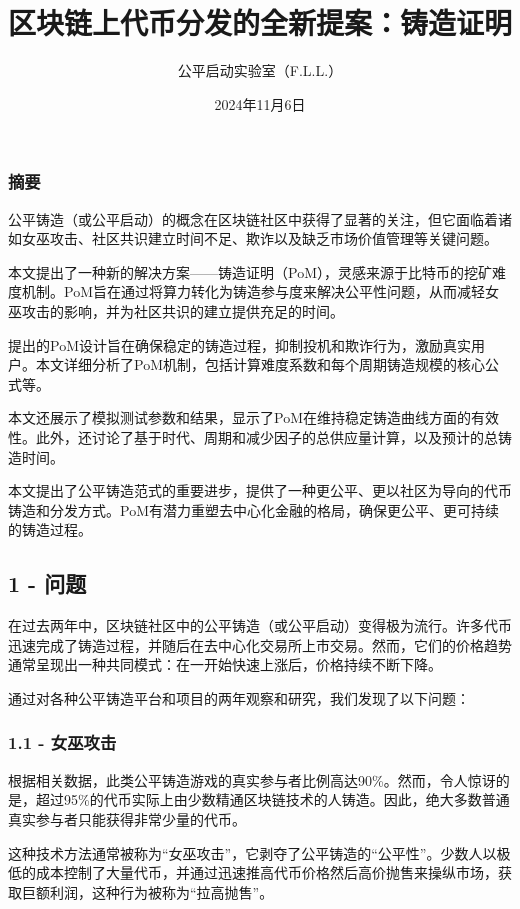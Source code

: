 \documentclass[
]{article}
\title{区块链上代币分发的全新提案：铸造证明}
\author{公平启动实验室（F.L.L.）}
\date{2024年11月6日}
\begin{document}
\maketitle

\subsubsection{摘要}\label{ux6458ux8981}

公平铸造（或公平启动）的概念在区块链社区中获得了显著的关注，但它面临着诸如女巫攻击、社区共识建立时间不足、欺诈以及缺乏市场价值管理等关键问题。

本文提出了一种新的解决方案------铸造证明（PoM），灵感来源于比特币的挖矿难度机制。PoM旨在通过将算力转化为铸造参与度来解决公平性问题，从而减轻女巫攻击的影响，并为社区共识的建立提供充足的时间。

提出的PoM设计旨在确保稳定的铸造过程，抑制投机和欺诈行为，激励真实用户。本文详细分析了PoM机制，包括计算难度系数和每个周期铸造规模的核心公式等。

本文还展示了模拟测试参数和结果，显示了PoM在维持稳定铸造曲线方面的有效性。此外，还讨论了基于时代、周期和减少因子的总供应量计算，以及预计的总铸造时间。

本文提出了公平铸造范式的重要进步，提供了一种更公平、更以社区为导向的代币铸造和分发方式。PoM有潜力重塑去中心化金融的格局，确保更公平、更可持续的铸造过程。

\subsection{1 - 问题}\label{ux95eeux9898}

在过去两年中，区块链社区中的公平铸造（或公平启动）变得极为流行。许多代币迅速完成了铸造过程，并随后在去中心化交易所上市交易。然而，它们的价格趋势通常呈现出一种共同模式：在一开始快速上涨后，价格持续不断下降。

通过对各种公平铸造平台和项目的两年观察和研究，我们发现了以下问题：

\subsubsection{1.1 - 女巫攻击}\label{ux5973ux5debux653bux51fb}

根据相关数据，此类公平铸造游戏的真实参与者比例高达90\%。然而，令人惊讶的是，超过95\%的代币实际上由少数精通区块链技术的人铸造。因此，绝大多数普通真实参与者只能获得非常少量的代币。

这种技术方法通常被称为``女巫攻击''，它剥夺了公平铸造的``公平性''。少数人以极低的成本控制了大量代币，并通过迅速推高代币价格然后高价抛售来操纵市场，获取巨额利润，这种行为被称为``拉高抛售''。
\end{document}

